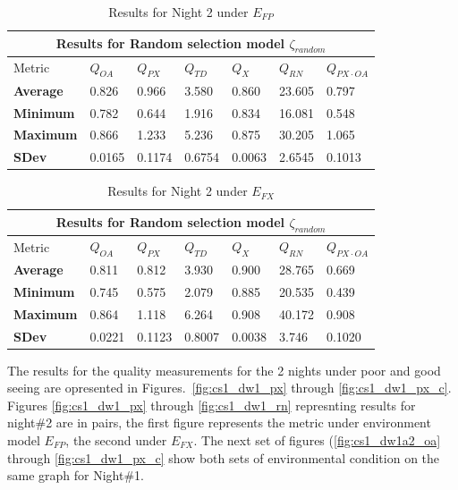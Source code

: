 \begin{table}
\begin{center}
\begin{tabular}{lllllll}
\toprule
\multicolumn{7}{c}{Results for Random selection model $\zeta_{random}$} \\
\midrule
Metric & $Q_{OA}$ & $Q_{PX}$ & $Q_{TD}$ & $Q_{X}$ & $Q_{RN}$ & $Q_{PX \cdot OA}$ \\
\midrule
{\bf Average} & 0.826  & 0.966  & 3.580  & 0.860  & 23.605 & 0.797\\
{\bf Minimum} & 0.782  & 0.644  & 1.916  & 0.834  & 16.081 & 0.548\\
{\bf Maximum} & 0.866  & 1.233  & 5.236  & 0.875  & 30.205 & 1.065\\
{\bf SDev}    & 0.0165 & 0.1174 & 0.6754 & 0.0063 & 2.6545 & 0.1013\\
\bottomrule
\end{tabular}
\end{center}
\caption{Results for Night 2 under $E_{FP}$}
\label{tab:rand_2fp}
\end{table}

\begin{table}
\begin{center}
\begin{tabular}{lllllll}
\toprule
\multicolumn{7}{c}{Results for Random selection model $\zeta_{random}$} \\
\midrule
Metric & $Q_{OA}$ & $Q_{PX}$ & $Q_{TD}$ & $Q_{X}$ & $Q_{RN}$ & $Q_{PX \cdot OA}$ \\
\midrule
{\bf Average} & 0.811  & 0.812  & 3.930  & 0.900  & 28.765 & 0.669\\
{\bf Minimum} & 0.745  & 0.575  & 2.079  & 0.885  & 20.535 & 0.439\\
{\bf Maximum} & 0.864  & 1.118  & 6.264  & 0.908  & 40.172 & 0.908\\
{\bf SDev}    & 0.0221 & 0.1123 & 0.8007 & 0.0038 & 3.746 & 0.1020\\
\bottomrule
\end{tabular}
\end{center}
\caption{Results for Night 2 under $E_{FX}$}
\label{tab:rand_2fx}
\end{table}


\clearpage
The results for the quality measurements for the 2 nights under poor and good seeing are opresented in Figures.~\ref{fig:cs1_dw1_px} through \ref{fig:cs1_dw1_px_c}. Figures \ref{fig:cs1_dw1_px} through \ref{fig:cs1_dw1_rn} represnting results for night\#2 are in pairs, the first figure represents the metric under environment model $E_{FP}$, the second under $E_{FX}$. The next set of figures (\ref{fig:cs1_dw1a2_oa} through \ref{fig:cs1_dw1_px_c} show both sets of environmental condition on the same graph for Night\#1.


